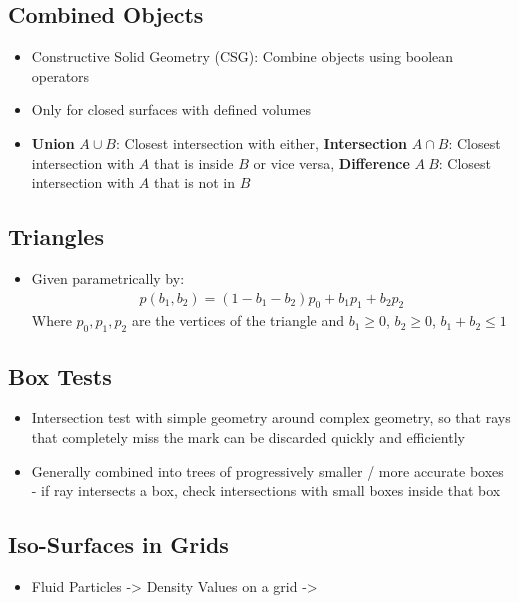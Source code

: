 \documentclass{scrartcl}
\begin{document}
\subsection*{Combined Objects}
\begin{itemize}
    \item Constructive Solid Geometry (CSG): Combine objects using boolean operators
    \item Only for closed surfaces with defined volumes
    \item \textbf{Union} $A \cup B$: Closest intersection with either, \textbf{Intersection} $A \cap B$: Closest intersection with $A$ that is inside $B$ or vice versa, \textbf{Difference} $A \ B$: Closest intersection with $A$ that is not in $B$
\end{itemize}
\subsection*{Triangles}
\begin{itemize}
    \item Given parametrically by:
    \begin{align*}
        p(b_1, b_2) = (1-b_1-b_2)p_0 + b_1 p_1 + b_2 p_2
    \end{align*}
    Where $p_0, p_1, p_2$ are the vertices of the triangle and $b_1 \geq 0$, $b_2 \geq 0$, $b_1 + b_2 \leq 1$
\end{itemize}
\subsection*{Box Tests}
\begin{itemize}
    \item Intersection test with simple geometry around complex geometry, so that rays that completely miss the mark can be discarded quickly and efficiently
    \item Generally combined into trees of progressively smaller / more accurate boxes - if ray intersects a box, check intersections with small boxes inside that box
\end{itemize}
\subsection*{Iso-Surfaces in Grids}
\begin{itemize}
    \item Fluid Particles -> Density Values on a grid -> 
\end{itemize}
\end{document}
